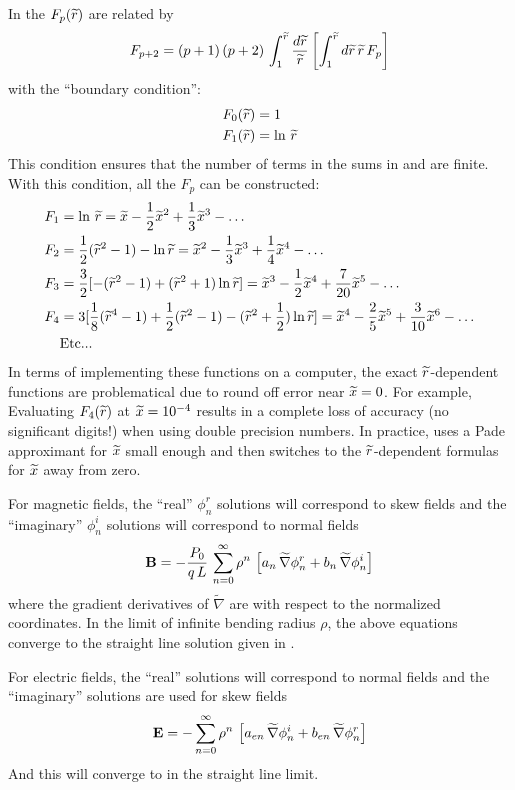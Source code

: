 In  the $F_p({\widetilde r})$ are related by
\begin{equation}
  F_{p+2} = (p + 1) \, (p + 2) \, \int_1^{{\widetilde r}} \frac{d{\widetilde r}}{{\widetilde r}} 
  \left[ \int_1^{{\widetilde r}} d{\widetilde r} \, {\widetilde r} \, F_{p} \right]
\end{equation}
with the ``boundary condition'':
\begin{align}
  F_0({\widetilde r}) &= 1 \nonumber \\
  F_1({\widetilde r}) &= \ln \, {\widetilde r}
\end{align}
This condition ensures that the number of terms in the sums in  and 
are finite. With this condition, all the $F_p$ can be constructed:
\begin{align}
  F_1 &= \ln \, {\widetilde r} = {\widetilde x} - \frac{1}{2}{\widetilde x}^2 + \frac{1}{3}{\widetilde x}^3 - \ldots \nonumber \\
  F_2 &= \frac{1}{2} ({\widetilde r}^2 - 1) - \ln {\widetilde r} = {\widetilde x}^2 - \frac{1}{3}{\widetilde x}^3 + \frac{1}{4} {\widetilde x}^4 - \ldots \nonumber \\
  F_3 &= \frac{3}{2} [-({\widetilde r}^2 - 1) + ({\widetilde r}^2 + 1) \ln {\widetilde r}] = {\widetilde x}^3 - \frac{1}{2} {\widetilde x}^4 + \frac{7}{20} {\widetilde x}^5 - \ldots 
         \label{ffff} \\
  F_4 &= 3 [ \frac{1}{8} ({\widetilde r}^4 - 1) + \frac{1}{2} ({\widetilde r}^2 - 1) - ({\widetilde r}^2 + \frac{1}{2}) \ln {\widetilde r}] = 
         {\widetilde x}^4 - \frac{2}{5} {\widetilde x}^5 + \frac{3}{10} {\widetilde x}^6 - \ldots \nonumber \\
  &\text{Etc...} \nonumber
\end{align}
In terms of implementing these functions on a computer, the exact ${\widetilde r}$-dependent functions are
problematical due to round off error near ${\widetilde x} = 0$. For example, Evaluating $F_4({\widetilde r})$ at ${\widetilde x} =
10^{-4}$ results in a complete loss of accuracy (no significant digits!) when using double precision
numbers. In practice, \bmad uses a Pade approximant for ${\widetilde x}$ small enough and then switches to the
${\widetilde r}$-dependent formulas for ${\widetilde x}$ away from zero.

For magnetic fields, the ``real'' $\phi_n^r$ solutions will correspond to skew fields and the
``imaginary'' $\phi_n^i$ solutions will correspond to normal fields
\begin{equation}
  {\bf B} = -\frac{P_0}{q \, L} \, 
    \sum_{n = 0}^\infty \rho^n \, \left[ a_n \, \widetilde \nabla \phi_n^r + b_n \, \widetilde \nabla \phi_n^i \right]
  \label{bpql}
\end{equation}
where the gradient derivatives of $\widetilde \nabla$ are with respect to the normalized
coordinates. In the limit of infinite bending radius $\rho$, the above equations converge
to the straight line solution given in .

For electric fields, the ``real'' solutions will correspond to normal fields and the
``imaginary'' solutions are used for skew fields
\begin{equation}
  {\bf E} = -\sum_{n = 0}^\infty \rho^n \, \left[ a_{en} \, \widetilde \nabla \phi_n^i + 
  b_{en} \, \widetilde \nabla \phi_n^r \right]
  \label{enrn}
\end{equation}
And this will converge to  in the straight line limit.

